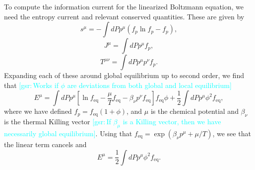 \documentclass[aps,prd,preprint,nofootinbib,amsmath,amssymb,showpacs,longbibliography,singlecolumn,superscriptaddress,10pt]{revtex4-1}
\theoremstyle{plain}
\theoremstyle{definition}
\newcommand{\gsr}[1]{{\textcolor{cyan}{[gsr:\,{#1}]}}}
\begin{document}
To compute the information current for the linearized Boltzmann equation, we need the entropy current and relevant conserved quantities. These are given by
\begin{equation}
    s^{\mu} = - \int dP p^{\mu} \left( f_p \ln f_p - f_p \right) ,
\end{equation}
\begin{equation}
    J^{\mu} = \int dP p^{\mu} f_p ,
\end{equation}
\begin{equation}
    T^{\mu\nu} = \int dP p^{\mu} p^{\nu} f_p .
\end{equation}
Expanding each of these around global equilibrium up to second order, we find that \gsr{Works if $\phi$ are deviations from both global and local equilibrium}
\begin{equation}
    E^{\mu} = \int dP p^{\mu} \left[ \ln f_{\mathrm{eq}} - \frac{\mu}{T} f_{\mathrm{eq}} - \beta_{\nu} p^{\nu} f_{\mathrm{eq}} \right] f_{\mathrm{eq}} \phi + \frac{1}{2} \int dP p^{\mu} \phi^2 f_{\mathrm{eq}},
\end{equation}
where we have defined $f_p = f_{\mathrm{eq}} (1 + \phi)$, and $\mu$ is the chemical potential and $\beta_{\nu}$ is the thermal Killing vector \gsr{If $\beta_{\mu}$ is a Killing vector, then we have necessarily global equilibrium}. Using that $f_{\mathrm{eq}} = \exp (\beta_{\nu} p^{\mu} + \mu / T)$, we see that the linear term cancels and 
\begin{equation}
    E^{\mu} = \frac{1}{2} \int dP p^{\mu} \phi^2 f_{\mathrm{eq}} .
\end{equation}
\end{document}
